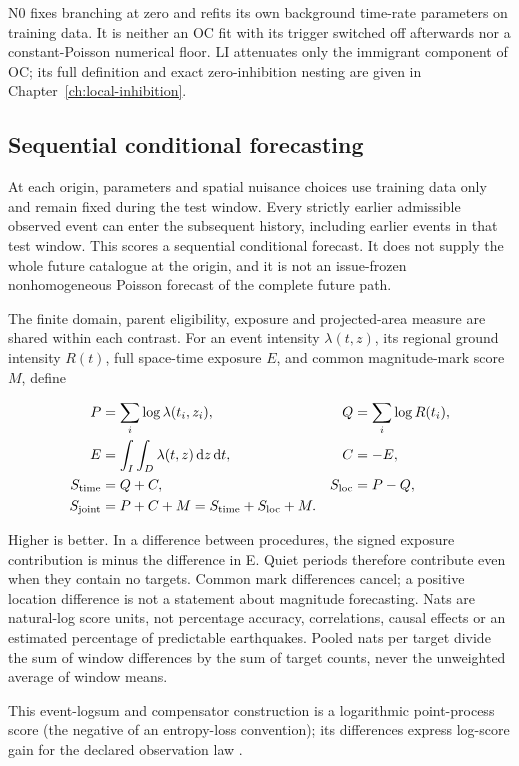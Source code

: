 N0 fixes branching at zero and refits its own background time-rate parameters on training data. It is neither an OC fit with its trigger switched off afterwards nor a constant-Poisson numerical floor. LI attenuates only the immigrant component of OC; its full definition and exact zero-inhibition nesting are given in Chapter~\ref{ch:local-inhibition}.

\subsection{Sequential conditional forecasting}

At each origin, parameters and spatial nuisance choices use training data only and remain fixed during the test window. Every strictly earlier admissible observed event can enter the subsequent history, including earlier events in that test window. This scores a sequential conditional forecast. It does not supply the whole future catalogue at the origin, and it is not an issue-frozen nonhomogeneous Poisson forecast of the complete future path.

The finite domain, parent eligibility, exposure and projected-area measure are shared within each contrast. For an event intensity \(\lambda(t,z)\), its regional ground intensity \(R(t)\), full space-time exposure \(E\), and common magnitude-mark score \(M\), define

\begin{align}
P&=\sum_i\log\lambda(t_i,z_i),&Q&=\sum_i\log R(t_i),\\
E&=\int_{I}\int_D\lambda(t,z)\,\mathrm dz\,\mathrm dt,&C&=-E,\\
S_{\rm time}&=Q+C,&S_{\rm loc}&=P-Q,\\
S_{\rm joint}&=P+C+M=S_{\rm time}+S_{\rm loc}+M.
\end{align}

Higher is better. In a difference between procedures, the signed exposure contribution is minus the difference in E. Quiet periods therefore contribute even when they contain no targets. Common mark differences cancel; a positive location difference is not a statement about magnitude forecasting. Nats are natural-log score units, not percentage accuracy, correlations, causal effects or an estimated percentage of predictable earthquakes. Pooled nats per target divide the sum of window differences by the sum of target counts, never the unweighted average of window means.

This event-logsum and compensator construction is a logarithmic point-process score (the negative of an entropy-loss convention); its differences express log-score gain for the declared observation law \citep{DaleyVereJones2004}.

